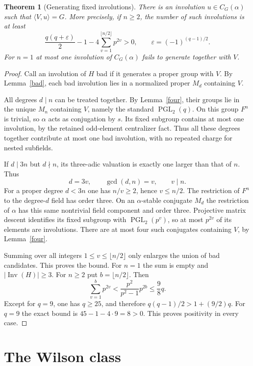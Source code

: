 \documentclass[11pt,a4paper]{article}
\newtheorem{theorem}[lemma]{Theorem}
\newcommand{\PGL}{\operatorname{PGL}}
\newcommand{\gen}[1]{\langle#1\rangle}
\begin{document}
\begin{theorem}[Generating fixed involutions]\label{generation}
There is an involution $u\in C_G(\alpha)$ such that
$\gen{V,u}=G$. More precisely, if $n\geq2$, the number of
such involutions is at least
\[
 \frac{q(q+\varepsilon)}2-1
       -4\sum_{v=1}^{\lfloor n/2\rfloor}p^{2v}>0,
 \qquad \varepsilon=(-1)^{(q-1)/2}.
\]
For $n=1$ at most one involution of $C_G(\alpha)$ fails to
generate together with $V$.
\end{theorem}
\begin{proof}
Call an involution of $H$ bad if it generates a proper group with
$V$. By Lemma~\ref{bad}, each bad involution lies in a normalized
proper $M_d$ containing $V$.

All degrees $d\mid n$ can be treated together. By
Lemma~\ref{four}, their groups lie in the unique $M_n$ containing
$V$, namely the standard $\PGL_2(q)$. On this group $F^n$ is
trivial, so $\alpha$ acts as conjugation by $s$. Its fixed subgroup
contains at most one involution, by the retained odd-element
centralizer fact. Thus all these degrees together contribute at most
one bad involution, with no repeated charge for nested subfields.

If $d\mid3n$ but $d\nmid n$, its three-adic valuation is exactly
one larger than that of $n$. Thus
\[
 d=3v,\qquad \gcd(d,n)=v,\qquad v\mid n.
\]
For a proper degree $d<3n$ one has $n/v\geq2$, hence
$v\leq n/2$. The restriction of $F^n$ to the degree-$d$ field
has order three. On an $\alpha$-stable conjugate $M_d$ the
restriction of $\alpha$ has this same nontrivial field component
and order three. Projective matrix descent identifies its fixed
subgroup with $\PGL_2(p^v)$, so at most $p^{2v}$ of its elements
are involutions. There are at most four such conjugates containing
$V$, by Lemma~\ref{four}.

Summing over all integers $1\leq v\leq\lfloor n/2\rfloor$
only enlarges the union of bad candidates. This proves the bound.
For $n=1$ the sum is empty and $|\operatorname{Inv}(H)|\geq3$.
For $n\geq2$ put $b=\lfloor n/2\rfloor$. Then
\[
 \sum_{v=1}^{b}p^{2v}<\frac{p^2}{p^2-1}p^{2b}
 \leq\frac98q.
\]
Except for $q=9$, one has $q\geq25$, and therefore
$q(q-1)/2>1+(9/2)q$. For $q=9$ the exact bound is
$45-1-4\cdot9=8>0$. This proves positivity in every case.
\end{proof}

\section{The Wilson class}
\end{document}
